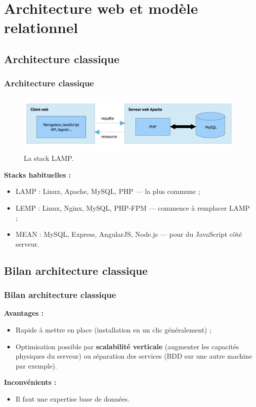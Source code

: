 \section{Architecture web et modèle relationnel}

    \subsection{Architecture classique}
    \begin{frame}
        \frametitle{Architecture classique}

        \begin{figure}[htb]
            \includegraphics[width=1\textwidth]{images/LAMP.png}
            \caption{La stack LAMP.}
        \end{figure}

        \textbf{Stacks habituelles :}
        \begin{itemize}
            \item LAMP : Linux, Apache, MySQL, PHP — la plus commune ;
            \item LEMP : Linux, Nginx, MySQL, PHP-FPM — commence à remplacer LAMP ;
            \item MEAN : MySQL, Express, AngularJS, Node.js — pour du JavaScript côté serveur.
        \end{itemize}
    \end{frame}

    \subsection{Bilan architecture classique}
    \begin{frame}
        \frametitle{Bilan architecture classique}

        \textbf{Avantages :}
        \begin{itemize}
            \item Rapide à mettre en place (installation en un clic généralement) ;
            \item Optimisation possible par \textbf{scalabilité verticale} (augmenter les capacités physiques du serveur) ou séparation des services (BDD sur une autre machine par exemple).
        \end{itemize}

        \vspace{20px}

        \textbf{Inconvénients :}
        \begin{itemize}
            \item Il faut une expertise base de données.
        \end{itemize}
    \end{frame}

